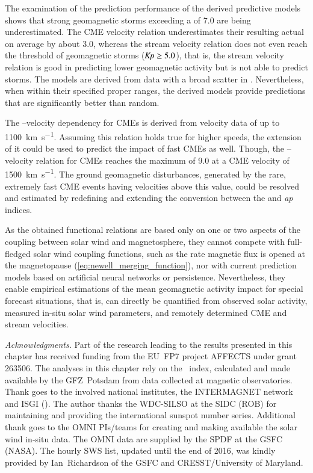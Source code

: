 The examination of the prediction performance of the derived predictive models shows that strong geomagnetic storms exceeding a \Kp{} of 7.0 are being underestimated. The CME velocity relation underestimates their resulting actual \Kp{} on average by about 3.0, whereas the stream velocity relation does not even reach the threshold of geomagnetic storms ($\text{\textit{Kp}} \geq 5.0$), that is, the stream velocity relation is good in predicting lower geomagnetic activity but is not able to predict storms.
The models are derived from data with a broad scatter in \Kp{}. Nevertheless, when within their specified proper ranges, the derived models provide predictions that are significantly better than random.

The \Kp--velocity dependency for CMEs is derived from velocity data of up to \SI{1100}{\km\per\s}. Assuming this relation holds true for higher speeds, the extension of it could be used to predict the \Kp{} impact of fast CMEs as well. Though, the \Kp--velocity relation for CMEs reaches the maximum \Kp{} of 9.0 at a CME velocity of \SI{1500}{\km\per\s}. The ground geomagnetic disturbances, generated by the rare, extremely fast CME events having velocities above this value, could be resolved and estimated by redefining and extending the conversion between the \Kp{} and \textit{ap} indices.

\pagebreak

As the obtained functional relations are based only on one or two aspects of the coupling between solar wind and magnetosphere, they cannot compete with full-fledged solar wind coupling functions, such as the rate magnetic flux is opened at the magnetopause (\autoref{eq:newell_merging_function}), nor with current prediction models based on artificial neural networks or \Kp{} persistence. Nevertheless, they enable empirical estimations of the mean geomagnetic activity impact for special forecast situations, that is, \Kp{} can directly be quantified from observed solar activity, measured in-situ solar wind parameters, and remotely determined CME and stream velocities.



\bigskip
{\small
\noindent \textit{Acknowledgments.} Part of the research leading to the results presented in this chapter has received funding from the EU~FP7 project AFFECTS under grant 263506.
The analyses in this chapter rely on the \Kp~index, calculated and made available by the GFZ~Potsdam from data collected at magnetic observatories. Thank goes to the involved national institutes, the INTERMAGNET network and ISGI (). The author thanks the WDC-SILSO at the SIDC (ROB) for maintaining and providing the international sunspot number series. Additional thank goes to the OMNI PIs/teams for creating and making available the solar wind in-situ data. The OMNI data are supplied by the SPDF at the GSFC (NASA). The hourly SWS list, updated until the end of 2016, was kindly provided by Ian~Richardson of the GSFC and CRESST/University of Maryland.
}

